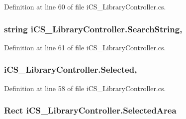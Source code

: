 Definition at line 60 of file i\+C\+S\+\_\+\+Library\+Controller.\+cs.

\hypertarget{classi_c_s___library_controller_a76133d9732f40a639efdbe59d50f29a9}{
\subsubsection[{Search\+String}]{\setlength{\rightskip}{0pt plus 5cm}string i\+C\+S\+\_\+\+Library\+Controller.\+Search\+String\hspace{0.3cm}{\ttfamily [get]}, {\ttfamily [set]}}}\label{classi_c_s___library_controller_a76133d9732f40a639efdbe59d50f29a9}


Definition at line 61 of file i\+C\+S\+\_\+\+Library\+Controller.\+cs.

\hypertarget{classi_c_s___library_controller_af9d1e98537cbae57970093edf9279a53}{
\subsubsection[{Selected}]{ i\+C\+S\+\_\+\+Library\+Controller.\+Selected\hspace{0.3cm}{\ttfamily [get]}, {\ttfamily [set]}}}\label{classi_c_s___library_controller_af9d1e98537cbae57970093edf9279a53}


Definition at line 58 of file i\+C\+S\+\_\+\+Library\+Controller.\+cs.

\hypertarget{classi_c_s___library_controller_ae2655750612741482b895fca22a19a76}{
\subsubsection[{Selected\+Area}]{\setlength{\rightskip}{0pt plus 5cm}Rect i\+C\+S\+\_\+\+Library\+Controller.\+Selected\+Area\hspace{0.3cm}{\ttfamily [get]}}}\label{classi_c_s___library_controller_ae2655750612741482b895fca22a19a76}


